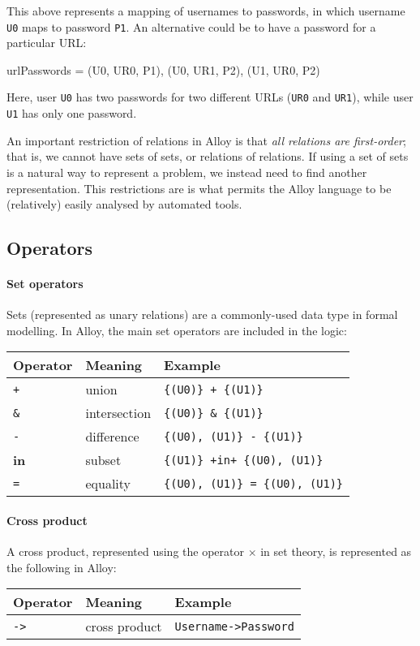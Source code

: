 This above represents a mapping of usernames to passwords, in which username \texttt{U0} maps to password \texttt{P1}. An alternative could be to have a password for a particular URL:

\begin{alloy}
 urlPasswords = {(U0, UR0, P1), (U0, UR1, P2), (U1, UR0, P2)}
\end{alloy}

Here, user \texttt{U0} has two passwords for two different URLs (\texttt{UR0} and \texttt{UR1}), while user \texttt{U1} has only one password.

An important restriction of relations in Alloy is that \emph{all relations are first-order}; that is, we cannot have sets of sets, or relations of relations. If using a set of sets is a natural way to represent a problem, we instead need to find another representation. This restrictions are is what permits the Alloy language to be (relatively) easily analysed by automated tools.


\subsection{Operators}

\paragraph{Set operators}
Sets (represented as unary relations) are a commonly-used data type in formal modelling. In Alloy, the main set operators are included in the logic:
%
\begin{center}
\begin{tabular}{lll}
\toprule
 Operator & Meaning & Example\\
\midrule
 \texttt{+}  & union         & \texttt{\{(U0)\} + \{(U1)\}}\\
 \texttt{\&} & intersection  & \texttt{\{(U0)\} \& \{(U1)\}}\\
 \texttt{-}  & difference    & \texttt{\{(U0), (U1)\} - \{(U1)\}}\\
 \textbf{in} & subset        & \texttt{\{(U1)\} \A+in+ \{(U0), (U1)\}}\\
 \texttt{=}  & equality      & \texttt{\{(U0), (U1)\} = \{(U0), (U1)\}}\\
\bottomrule
\end{tabular}
\end{center}

\paragraph{Cross product}
A cross product, represented using the operator $\times$ in set theory, is represented as the following in Alloy:
%
\begin{center}
\begin{tabular}{lll}
\toprule
 Operator & Meaning & Example\\
\midrule
 \texttt{->}  & cross product & \texttt{Username->Password}\\
\bottomrule
\end{tabular}
\end{center}

